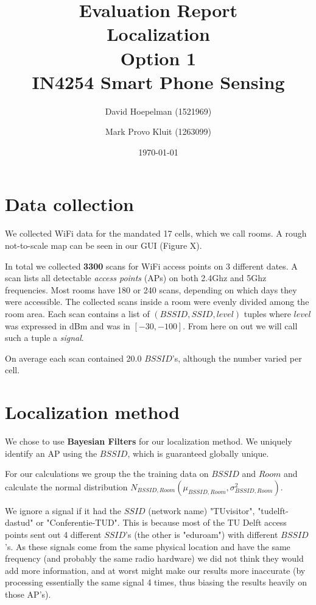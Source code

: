 \documentclass[a4paper,10pt,twoside]{IEEEtran}
\title{\huge{\textbf{Evaluation Report\\Localization\\Option 1}\\IN4254 Smart Phone Sensing}}
\date{\today}
\author{David Hoepelman (1521969) \and Mark Provo Kluit (1263099)}
\begin{document}
\maketitle

\section{Data collection}
\label{sec:localization-method}

We collected WiFi data for the mandated 17 cells, which we call rooms.
A rough not-to-scale map can be seen in our GUI (Figure X).

In total we collected \textbf{3300} scans for WiFi access points on 3 different dates.
A scan lists all detectable \emph{access points} (APs) on both 2.4Ghz and 5Ghz frequencies.
Most rooms have 180 or 240 scans, depending on which days they were accessible.
The collected scans inside a room were evenly divided among the room area.
Each scan contains a list of $(BSSID, SSID, level)$ tuples where $level$ was expressed in dBm and was in $[-30,-100]$.
From here on out we will call such a tuple a \emph{signal}.

On average each scan contained 20.0 $BSSID$'s, although the number varied per cell.

\section{Localization method}
\label{sec:data}

We chose to use \textbf{Bayesian Filters} for our localization method. We uniquely identify an AP using the $BSSID$, which is guaranteed globally unique.

For our calculations we group the the training data on $BSSID$ and $Room$ and calculate the normal distribution $N_{BSSID,Room}(\mu_{BSSID,Room}, \sigma^2_{BSSID,Room})$.

We ignore a signal if it had the $SSID$ (network name) "TUvisitor", "tudelft-dastud" or "Conferentie-TUD".
This is because most of the TU Delft access points sent out 4 different $SSID$'s (the other is "eduroam") with different $BSSID$'s.
As these signals come from the same physical location and have the same frequency (and probably the same radio hardware) we did not think they would add more information, and at worst might make our results more inaccurate (by processing essentially the same signal 4 times, thus biasing the results heavily on those AP's).
\end{document}
